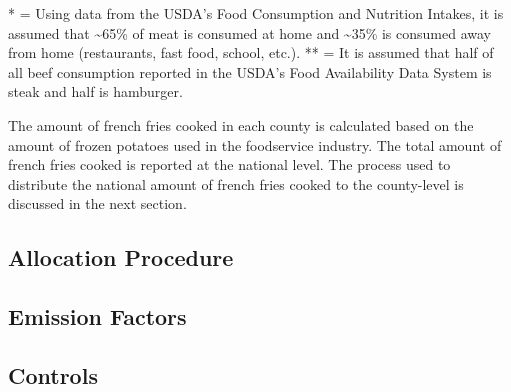 \documentclass[
  11pt,
  oneside]{book}
\begin{document}
\begin{table}[H]
\centering
\caption{\label{tab:scale-factor}Scale Factor Derivation}
\centering
{}
\end{table}

\noindent
* = Using data from the USDA's Food Consumption and Nutrition Intakes, it is assumed that \textasciitilde65\% of meat is consumed at home and \textasciitilde35\% is consumed away from home (restaurants, fast food, school, etc.). \newline
** = It is assumed that half of all beef consumption reported in the USDA's Food Availability Data System is steak and half is hamburger. \newline

The amount of french fries cooked in each county is calculated based on the amount of frozen potatoes used in the foodservice industry. The total amount of french fries cooked is reported at the national level. The process used to distribute the national amount of french fries cooked to the county-level is discussed in the next section.

\subsection{Allocation Procedure}\label{allocation-procedure}

\subsection{Emission Factors}\label{emission-factors}

\subsection{Controls}\label{controls}
\end{document}
